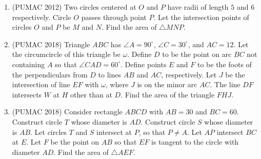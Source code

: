 \documentclass[11pt]{scrartcl}
\begin{document}
\begin{enumerate}
    \item (PUMAC 2012) Two circles centered at $O$ and $P$ have radii of length $5$ and $6$ respectively. Circle $O$ passes through point $P$. Let the intersection points of circles $O$ and $P$ be $M$ and $N$. Find the area of $\triangle MNP$.


    \item (PUMAC 2018) Triangle $ABC$ has $\angle A = 90^\circ$, $\angle C = 30^\circ$, and $AC = 12$. Let the circumcircle of this triangle be $\omega$. Define $D$ to be the point on arc $BC$ not containing $A$ so that $\angle CAD = 60^\circ$. Define points $E$ and $F$ to be the foots of the perpendiculars from $D$ to lines $AB$ and $AC$, respectively. Let $J$ be the intersection of line $EF$ with $\omega$, where $J$ is on the minor arc $AC$. The line $DF$ intersects $W$ at $H$ other than at $D$. Find the area of the triangle $FHJ$.


    \item (PUMAC 2018) Consider rectangle $ABCD$ with $AB = 30$ and $BC = 60$. Construct circle $T$ whose diameter is $AD$. Construct circle $S$ whose diameter is $AB$. Let circles $T$ and $S$ intersect at $P$, so that $P \neq A$. Let $AP$ intersect $BC$ at $E$. Let $F$ be the point on $AB$ so that $EF$ is tangent to the circle with diameter $AD$. Find the area of $\triangle AEF$.
\end{enumerate}
\end{document}
